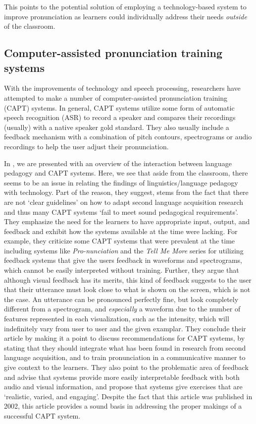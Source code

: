\documentclass
[
    a4paper,
    twoside,
    12pt
]
{report}
\begin{document}
This points to the potential solution of employing a technology-based
system to improve pronunciation as learners could individually address
their needs \textit{outside} of the classroom.

\subsection{Computer-assisted pronunciation training
systems}\label{computer-assisted-pronunciation-training-systems}

\label{sec:capt} With the improvements of technology and speech
processing, researchers have attempted to make a number of
computer-assisted pronunciation training (CAPT) systems. In general,
CAPT systems utilize some form of automatic speech recognition (ASR) to
record a speaker and compares their recordings (usually) with a native
speaker gold standard. They also usually include a feedback mechanism
with a combination of pitch contours, spectrograms or audio recordings
to help the user adjust their pronunciation.

In \textcite{neri2002}, we are presented with an overview of the
interaction between language pedagogy and CAPT systems. Here, we see
that aside from the classroom, there seems to be an issue in relating
the findings of linguistics/language pedagogy with technology. Part of
the reason, they suggest, stems from the fact that there are not `clear
guidelines' on how to adapt second language acquisition research and
thus many CAPT systems `fail to meet sound pedagogical requirements'.
They emphasize the need for the learners to have appropriate input,
output, and feedback and exhibit how the systems available at the time
were lacking. For example, they criticize some CAPT systems that were
prevalent at the time including systems like \textit{Pro-nunciation} and
the \textit{Tell Me More} series for utilizing feedback systems that
give the users feedback in waveforms and spectrograms, which cannot be
easily interpreted without training. Further, they argue that although
visual feedback has its merits, this kind of feedback suggests to the
user that their utterance must look close to what is shown on the
screen, which is not the case. An utterance can be pronounced perfectly
fine, but look completely different from a spectrogram, and
\textit{especially} a waveform due to the number of features represented
in each visualization, such as the intensity, which will indefinitely
vary from user to user and the given examplar. They conclude their
article by making it a point to discuss recommendations for CAPT
systems, by stating that they should integrate what has been found in
research from second language acquisition, and to train pronunciation in
a communicative manner to give context to the learners. They also point
to the problematic area of feedback and advise that systems provide more
easily interpretable feedback with both audio and visual information,
and propose that systems give exercises that are `realistic, varied, and
engaging'. Despite the fact that this article was published in 2002,
this article provides a sound basis in addressing the proper makings of
a successful CAPT system.
\end{document}
